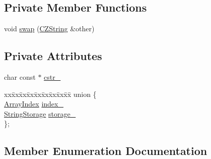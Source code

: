\subsection*{Private Member Functions}
\begin{DoxyCompactItemize}
\item 
void \hyperlink{classJson_1_1Value_1_1CZString_ad59f3542d2eea749a6a63409d1a02207_ad59f3542d2eea749a6a63409d1a02207}{swap} (\hyperlink{classJson_1_1Value_1_1CZString}{C\+Z\+String} \&other)
\end{DoxyCompactItemize}
\subsection*{Private Attributes}
\begin{DoxyCompactItemize}
\item 
char const  $\ast$ \hyperlink{classJson_1_1Value_1_1CZString_a5b4d28349294034d7f779c3c95d0306c_a5b4d28349294034d7f779c3c95d0306c}{cstr\+\_\+}
\item 
\begin{tabbing}
xx\=xx\=xx\=xx\=xx\=xx\=xx\=xx\=xx\=\kill
union \{\\
\>\hyperlink{classJson_1_1Value_a184a91566cccca7b819240f0d5561c7d_a184a91566cccca7b819240f0d5561c7d}{ArrayIndex} \hyperlink{classJson_1_1Value_1_1CZString_aecf29982235c9c165a0971023ebbb270_aecf29982235c9c165a0971023ebbb270}{index\_}\\
\>\hyperlink{structJson_1_1Value_1_1CZString_1_1StringStorage}{StringStorage} \hyperlink{classJson_1_1Value_1_1CZString_a17c92f0f089a4314e3b1d5695dc1a851_a17c92f0f089a4314e3b1d5695dc1a851}{storage\_}\\
\}; \\

\end{tabbing}\end{DoxyCompactItemize}


\subsection{Member Enumeration Documentation}
\mbox{\label{classJson_1_1Value_1_1CZString_a2805c46fb4a72bbaed55de6d75941b6d_a2805c46fb4a72bbaed55de6d75941b6d}} 
